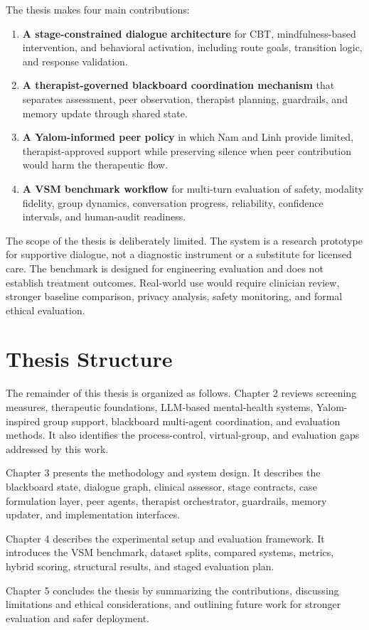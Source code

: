 The thesis makes four main contributions:

\begin{enumerate}
    \item \textbf{A stage-constrained dialogue architecture} for CBT, mindfulness-based intervention, and behavioral activation, including route goals, transition logic, and response validation.
    \item \textbf{A therapist-governed blackboard coordination mechanism} that separates assessment, peer observation, therapist planning, guardrails, and memory update through shared state.
    \item \textbf{A Yalom-informed peer policy} in which Nam and Linh provide limited, therapist-approved support while preserving silence when peer contribution would harm the therapeutic flow.
    \item \textbf{A VSM benchmark workflow} for multi-turn evaluation of safety, modality fidelity, group dynamics, conversation progress, reliability, confidence intervals, and human-audit readiness.
\end{enumerate}

The scope of the thesis is deliberately limited. The system is a research prototype for supportive dialogue, not a diagnostic instrument or a substitute for licensed care. The benchmark is designed for engineering evaluation and does not establish treatment outcomes. Real-world use would require clinician review, stronger baseline comparison, privacy analysis, safety monitoring, and formal ethical evaluation.

\section{Thesis Structure}

The remainder of this thesis is organized as follows. Chapter 2 reviews screening measures, therapeutic foundations, LLM-based mental-health systems, Yalom-inspired group support, blackboard multi-agent coordination, and evaluation methods. It also identifies the process-control, virtual-group, and evaluation gaps addressed by this work.

Chapter 3 presents the methodology and system design. It describes the blackboard state, dialogue graph, clinical assessor, stage contracts, case formulation layer, peer agents, therapist orchestrator, guardrails, memory updater, and implementation interfaces.

Chapter 4 describes the experimental setup and evaluation framework. It introduces the VSM benchmark, dataset splits, compared systems, metrics, hybrid scoring, structural results, and staged evaluation plan.

Chapter 5 concludes the thesis by summarizing the contributions, discussing limitations and ethical considerations, and outlining future work for stronger evaluation and safer deployment.
